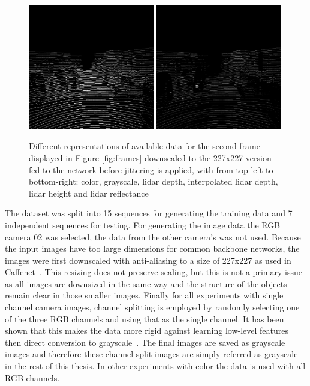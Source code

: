 \begin{figure}
\includegraphics[width=0.49\textwidth]{images/lidar_height.png}
\includegraphics[width=0.49\textwidth]{images/lidar_refl.png}
\caption{Different representations of available data for the second frame displayed in Figure \ref{fig:frames} downscaled to the 227x227 version fed to the network before jittering is applied, with from top-left to bottom-right: color, grayscale, lidar depth, interpolated lidar depth, lidar height and lidar reflectance}
\label{fig:features}
\end{figure}

The dataset was split into 15 sequences for generating the training data and 7 independent sequences for testing. For generating the image data the RGB camera 02 was selected, the data from the other camera's was not used. Because the input images have too large dimensions for common backbone networks, the images were first downscaled with anti-aliasing to a size of 227x227 as used in Caffenet~\cite{jia2014}. This resizing does not preserve scaling, but this is not a primary issue as all images are downsized in the same way and the structure of the objects remain clear in those smaller images. Finally for all experiments with single channel camera images, channel splitting is employed by randomly selecting one of the three RGB channels and using that as the single channel. It has been shown that this makes the data more rigid against learning low-level features then direct conversion to grayscale~\cite{lee2017}. The final images are saved as grayscale images and therefore these channel-split images are simply referred as grayscale in the rest of this thesis. In other experiments with color the data is used with all RGB channels.

